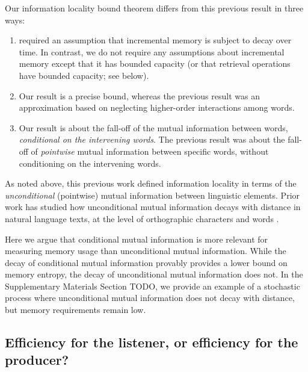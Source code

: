 Our information locality bound theorem differs from this previous result in three ways:
\begin{enumerate}
    \item \citet{futrell2020lossy} required an assumption that incremental memory is subject to decay over time. In contrast, we do not require any assumptions about incremental memory except that it has bounded capacity (or that retrieval operations have bounded capacity; see below).
    \item Our result is a precise bound, whereas the previous result was an approximation based on neglecting higher-order interactions among words.
    \item Our result is about the fall-off of the mutual information between words, \emph{conditional on the intervening words}. The previous result was about the fall-off of \emph{pointwise} mutual information between specific words, without conditioning on the intervening words.
\end{enumerate}

As noted above, this previous work defined information locality in terms of the \emph{unconditional} (pointwise) mutual information between linguistic elements. 
Prior work has studied how unconditional mutual information decays with distance in natural language texts, at the level of orthographic characters \citep{ebeling-entropy-1994,lin-critical-2017} and words \citep{futrell2019syntactic}.

Here we argue that conditional mutual information is more relevant for measuring memory usage than unconditional mutual information. 
While the decay of conditional mutual information provably provides a lower bound on memory entropy, the decay of unconditional mutual information does not.
In the Supplementary Materials Section TODO, we provide an example of a stochastic process where unconditional mutual information does not decay with distance, but memory requirements remain low.


\subsection{Efficiency for the listener, or efficiency for the producer?}

